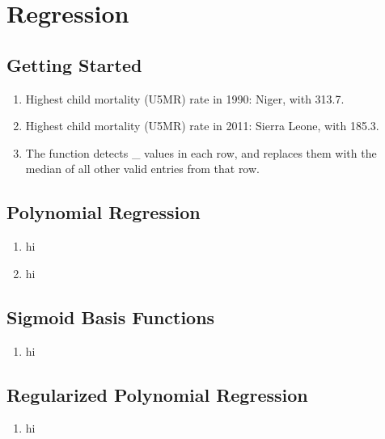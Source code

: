 \documentclass{article}
\begin{document}
\section{Regression}
\subsection{Getting Started}

\begin{enumerate}
\item Highest child mortality (U5MR) rate in 1990: Niger, with 313.7.
\item Highest child mortality (U5MR) rate in 2011: Sierra Leone, with 185.3.
\item The function detects \_ values in each row, and replaces
  them with the median of all other valid entries from that row.
\end{enumerate}

\subsection{Polynomial Regression}

\begin{enumerate}
\item hi
\item hi
\end{enumerate}

\subsection{Sigmoid Basis Functions}

\begin{enumerate}
  \item hi
\end{enumerate}

\subsection{Regularized Polynomial Regression}

\begin{enumerate}
  \item hi
\end{enumerate}
\end{document}
